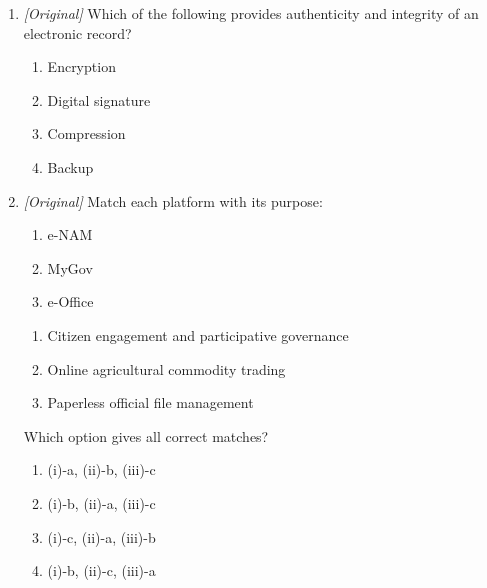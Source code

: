 \documentclass[11pt]{article}
\begin{document}
\begin{enumerate}[label=\textbf{Q\arabic*.}, leftmargin=*]
\begin{enumerate}[label=\Alph*.]
    \item GeM --- digital document storage
  \end{enumerate}
\item \textit{[Original]} Which of the following provides authenticity and
  integrity of an electronic record?
  \begin{enumerate}[label=\Alph*.]
    \item Encryption
    \item Digital signature
    \item Compression
    \item Backup
  \end{enumerate}
\item \textit{[Original]} Match each platform with its purpose:
  \begin{enumerate}[label=(\roman*)]
    \item e-NAM
    \item MyGov
    \item e-Office
  \end{enumerate}
  \begin{enumerate}[label=(\alph*)]
    \item Citizen engagement and participative governance
    \item Online agricultural commodity trading
    \item Paperless official file management
  \end{enumerate}
  Which option gives all correct matches?
  \begin{enumerate}[label=\Alph*.]
    \item (i)-a, (ii)-b, (iii)-c
    \item (i)-b, (ii)-a, (iii)-c
    \item (i)-c, (ii)-a, (iii)-b
    \item (i)-b, (ii)-c, (iii)-a
  \end{enumerate}


\end{enumerate}
\end{document}
